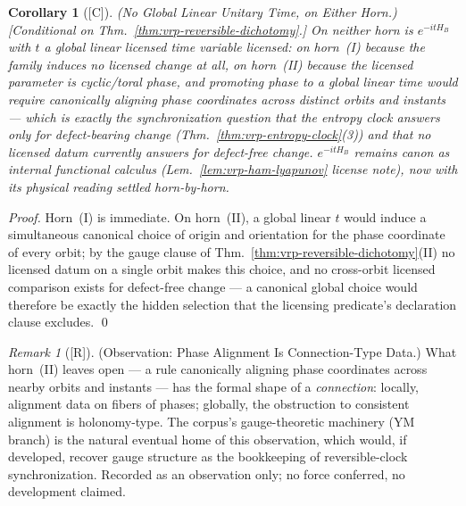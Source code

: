 \documentclass[12pt,oneside]{amsbook}
\theoremstyle{plain}
\newtheorem{corollary}[theorem]{Corollary}
\theoremstyle{definition}
\theoremstyle{remark}
\newtheorem{remark}[theorem]{Remark}
\newcommand{\status}[1]{\textup{[#1]}}
\begin{document}
\begin{corollary}[\status{C}]\label{cor:vrp-no-global-unitary-time}
\textup{(No Global Linear Unitary Time, on Either Horn.)}
\textup{[Conditional on
Thm.~\ref{thm:vrp-reversible-dichotomy}.]}
On neither horn is $e^{-itH_B}$ with $t$ a global linear licensed
time variable licensed: on horn~(I) because the family induces no
licensed change at all, on horn~(II) because the licensed
parameter is cyclic/toral phase, and promoting phase to a global
linear time would require canonically aligning phase coordinates
across distinct orbits and instants --- which is exactly the
synchronization question that the entropy clock answers only for
defect-bearing change (Thm.~\ref{thm:vrp-entropy-clock}(3)) and
that no licensed datum currently answers for defect-free change.
$e^{-itH_B}$ remains canon as internal functional calculus
(Lem.~\ref{lem:vrp-ham-lyapunov} license note), now with its
physical reading settled horn-by-horn.
\end{corollary}

\begin{proof}
Horn~(I) is immediate.  On horn~(II), a global linear $t$ would
induce a simultaneous canonical choice of origin and orientation
for the phase coordinate of every orbit; by the gauge clause of
Thm.~\ref{thm:vrp-reversible-dichotomy}(II) no licensed datum on
a single orbit makes this choice, and no cross-orbit licensed
comparison exists for defect-free change --- a canonical global
choice would therefore be exactly the hidden selection that the
licensing predicate's declaration clause excludes.  \qed
\end{proof}

\begin{remark}[\status{R}]\label{rmk:vrp-phase-connection}
\textup{(Observation: Phase Alignment Is Connection-Type Data.)}
What horn~(II) leaves open --- a rule canonically aligning phase
coordinates across nearby orbits and instants --- has the formal
shape of a \emph{connection}: locally, alignment data on fibers of
phases; globally, the obstruction to consistent alignment is
holonomy-type.  The corpus's gauge-theoretic machinery (YM
branch) is the natural eventual home of this observation, which
would, if developed, recover gauge structure as the bookkeeping of
reversible-clock synchronization.  Recorded as an observation
only; no force conferred, no development claimed.
\end{remark}
\end{document}
